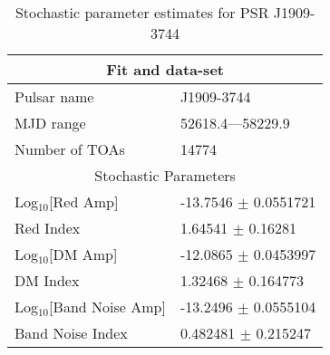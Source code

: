 \documentclass{article}
\begin{document}
\begin{table*}
\caption{Stochastic parameter estimates for PSR J1909-3744}
\begin{tabular}{ll}
\hline\hline
\multicolumn{2}{c}{Fit and data-set} \\ 
\hline
Pulsar name\dotfill & J1909-3744 \\ 
MJD range\dotfill & 52618.4---58229.9 \\ 
Number of TOAs\dotfill & 14774 \\
\hline
\multicolumn{2}{c}{Stochastic Parameters} \\ 
\hline
Log$_{10}$[Red Amp] \dotfill & -13.7546 $\pm$ 0.0551721  \\ 
Red Index \dotfill & 1.64541 $\pm$ 0.16281  \\ 
Log$_{10}$[DM Amp] \dotfill & -12.0865 $\pm$ 0.0453997  \\ 
DM Index \dotfill & 1.32468 $\pm$ 0.164773  \\ 
Log$_{10}$[Band Noise Amp] \dotfill & -13.2496 $\pm$ 0.0555104  \\ 
Band Noise Index \dotfill & 0.482481 $\pm$ 0.215247  \\ 
\hline
\end{tabular}
\label{Table:J1909-3744}
\end{table*} 
\end{document}
